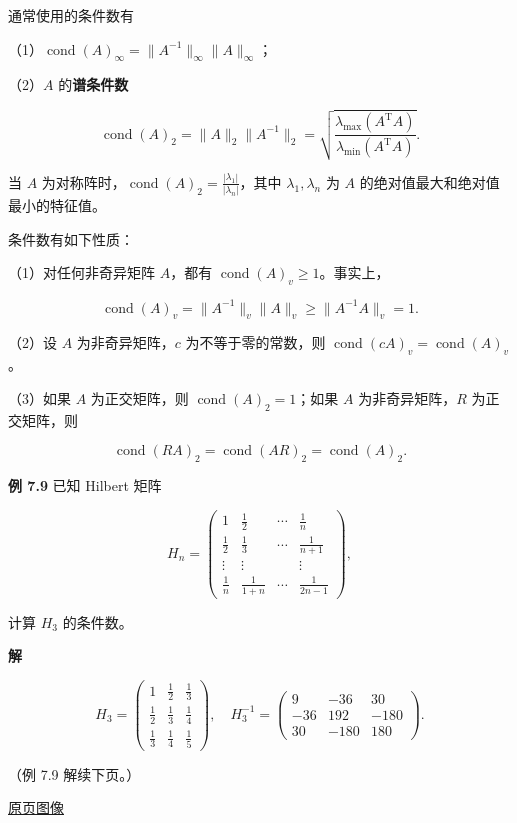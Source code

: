 \documentclass[
  10pt,
  fontset=fandol]{ctexart}
\begin{document}
通常使用的条件数有

（1）\(\operatorname{cond}(A)_\infty=\|A^{-1}\|_\infty\|A\|_\infty\)；

（2）\(A\) 的\textbf{谱条件数}

\[
\operatorname{cond}(A)_2=\|A\|_2\|A^{-1}\|_2
=\sqrt{\frac{\lambda_{\max}(A^{\mathrm T}A)}{\lambda_{\min}(A^{\mathrm T}A)}}.
\]

当 \(A\) 为对称阵时，\(\operatorname{cond}(A)_2=\frac{|\lambda_1|}{|\lambda_n|}\)，其中 \(\lambda_1,\lambda_n\) 为 \(A\) 的绝对值最大和绝对值最小的特征值。

条件数有如下性质：

（1）对任何非奇异矩阵 \(A\)，都有 \(\operatorname{cond}(A)_v\geqslant1\)。事实上，

\[
\operatorname{cond}(A)_v=\|A^{-1}\|_v\|A\|_v\geqslant\|A^{-1}A\|_v=1.
\]

（2）设 \(A\) 为非奇异矩阵，\(c\) 为不等于零的常数，则 \(\operatorname{cond}(cA)_v=\operatorname{cond}(A)_v\)。

（3）如果 \(A\) 为正交矩阵，则 \(\operatorname{cond}(A)_2=1\)；如果 \(A\) 为非奇异矩阵，\(R\) 为正交矩阵，则

\[
\operatorname{cond}(RA)_2=\operatorname{cond}(AR)_2=\operatorname{cond}(A)_2.
\]

\textbf{例 7.9} 已知 Hilbert 矩阵

\[
H_n=\begin{pmatrix}
1&\frac12&\cdots&\frac1n\\[4pt]
\frac12&\frac13&\cdots&\frac1{n+1}\\
\vdots&\vdots&&\vdots\\
\frac1n&\frac1{1+n}&\cdots&\frac1{2n-1}
\end{pmatrix},
\]

计算 \(H_3\) 的条件数。

\textbf{解}

\[
H_3=\begin{pmatrix}
1&\frac12&\frac13\\[4pt]
\frac12&\frac13&\frac14\\[4pt]
\frac13&\frac14&\frac15
\end{pmatrix},\quad
H_3^{-1}=\begin{pmatrix}
9&-36&30\\
-36&192&-180\\
30&-180&180
\end{pmatrix}.
\]

（例 7.9 解续下页。）

\href{../../source-images/pdf-208.jpeg}{原页图像}
\end{document}
